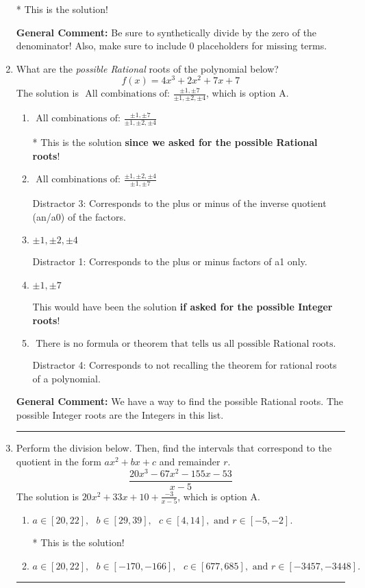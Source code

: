 \documentclass{extbook}[14pt]
\newcommand{\litem}[1]{\item #1

\rule{\textwidth}{0.4pt}}
\begin{document}
\begin{enumerate}
{\begin{enumerate}[label=\Alph*.]
* This is the solution!
\end{enumerate}

\textbf{General Comment:} Be sure to synthetically divide by the zero of the denominator! Also, make sure to include 0 placeholders for missing terms.
}
\litem{
What are the \textit{possible Rational} roots of the polynomial below?
\[ f(x) = 4x^{3} +2 x^{2} +7 x + 7 \]The solution is \( \text{ All combinations of: }\frac{\pm 1,\pm 7}{\pm 1,\pm 2,\pm 4} \), which is option A.\begin{enumerate}[label=\Alph*.]
\item \( \text{ All combinations of: }\frac{\pm 1,\pm 7}{\pm 1,\pm 2,\pm 4} \)

* This is the solution \textbf{since we asked for the possible Rational roots}!
\item \( \text{ All combinations of: }\frac{\pm 1,\pm 2,\pm 4}{\pm 1,\pm 7} \)

 Distractor 3: Corresponds to the plus or minus of the inverse quotient (an/a0) of the factors. 
\item \( \pm 1,\pm 2,\pm 4 \)

 Distractor 1: Corresponds to the plus or minus factors of a1 only.
\item \( \pm 1,\pm 7 \)

This would have been the solution \textbf{if asked for the possible Integer roots}!
\item \( \text{ There is no formula or theorem that tells us all possible Rational roots.} \)

 Distractor 4: Corresponds to not recalling the theorem for rational roots of a polynomial.
\end{enumerate}

\textbf{General Comment:} We have a way to find the possible Rational roots. The possible Integer roots are the Integers in this list.
}
\litem{
Perform the division below. Then, find the intervals that correspond to the quotient in the form $ax^2+bx+c$ and remainder $r$.
\[ \frac{20x^{3} -67 x^{2} -155 x -53}{x -5} \]The solution is \( 20x^{2} +33 x + 10 + \frac{-3}{x -5} \), which is option A.\begin{enumerate}[label=\Alph*.]
\item \( a \in [20, 22], \text{   } b \in [29, 39], \text{   } c \in [4, 14], \text{   and   } r \in [-5, -2]. \)

* This is the solution!
\item \( a \in [20, 22], \text{   } b \in [-170, -166], \text{   } c \in [677, 685], \text{   and   } r \in [-3457, -3448]. \)


\end{enumerate}}
\end{enumerate}
\end{document}
